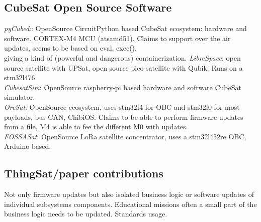 \subsection{CubeSat Open Source Software}
\label{sec:open-source-cubesat}
\textit{pyCubed}:\cite{Holliday2019PyCubed}: OpenSource CircuitPython based CubeSat
ecosystem: hardware and software. CORTEX-M4 MCU (atsamd51). Claims to support
over the air updates, seems to be based on eval, exec(),\\
giving a kind of (powerful and dangerous) containerization.
\textit{LibreSpace}: \cite{librespace} open source satellite with UPSat, open source pico-satellite
with Qubik. Runs on a stm32l476.\\
\textit{CubesatSim}:\cite{amsatcubesat} OpenSource raspberry-pi based hardware and
software CubeSat simulator.\\
\textit{OreSat}\cite{spivey2021oresat}: OpenSource ecosystem, uses stm32f4 for OBC
and stm32f0 for most payloads, bus CAN, ChibiOS. Claims to be able to perform
firmware updates from a file, M4 is able to fee the different M0 with updates.\\
\textit{FOSSASat}: OpenSource LoRa satellite concentrator, uses a stm32l452re OBC,
Arduino based.\\


\fi

\subsection{ThingSat/paper contributions}
Not only firmware updates but also isolated business logic or software updates of
individual subsystems components. Educational missions often a small part of the
business logic needs to be updated. Standards usage.
